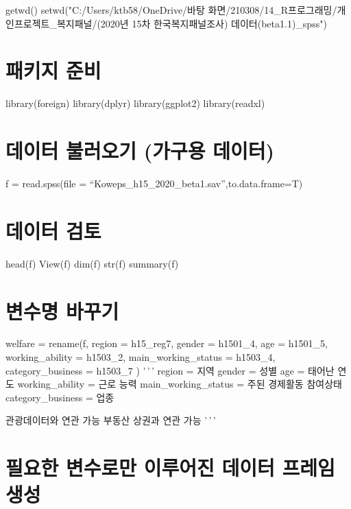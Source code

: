 \documentclass[
]{article}
\author{}
\date{\vspace{-2.5em}}
\begin{document}
getwd() setwd("C:/Users/ktb58/OneDrive/바탕
화면/210308/14\_R프로그래밍/개인프로젝트\_복지패널/(2020년 15차
한국복지패널조사) 데이터(beta1.1)\_spss")

\hypertarget{uxd328uxd0a4uxc9c0-uxc900uxbe44}{%
\section{패키지 준비}\label{uxd328uxd0a4uxc9c0-uxc900uxbe44}}

library(foreign) library(dplyr) library(ggplot2) library(readxl)

\hypertarget{uxb370uxc774uxd130-uxbd88uxb7ecuxc624uxae30-uxac00uxad6cuxc6a9-uxb370uxc774uxd130}{%
\section{데이터 불러오기 (가구용
데이터)}\label{uxb370uxc774uxd130-uxbd88uxb7ecuxc624uxae30-uxac00uxad6cuxc6a9-uxb370uxc774uxd130}}

f = read.spss(file = ``Koweps\_h15\_2020\_beta1.sav'',to.data.frame=T)

\hypertarget{uxb370uxc774uxd130-uxac80uxd1a0}{%
\section{데이터 검토}\label{uxb370uxc774uxd130-uxac80uxd1a0}}

head(f) View(f) dim(f) str(f) summary(f)

\hypertarget{uxbcc0uxc218uxba85-uxbc14uxafb8uxae30}{%
\section{변수명 바꾸기}\label{uxbcc0uxc218uxba85-uxbc14uxafb8uxae30}}

welfare = rename(f, region = h15\_reg7, gender = h1501\_4, age =
h1501\_5, working\_ability = h1503\_2, main\_working\_status = h1503\_4,
category\_business = h1503\_7 ) '\,'\,' region = 지역 gender = 성별 age
= 태어난 연도 working\_ability = 근로 능력 main\_working\_status = 주된
경제활동 참여상태 category\_business = 업종

관광데이터와 연관 가능 부동산 상권과 연관 가능 '\,'\,'

\hypertarget{uxd544uxc694uxd55c-uxbcc0uxc218uxb85cuxb9cc-uxc774uxb8e8uxc5b4uxc9c4-uxb370uxc774uxd130-uxd504uxb808uxc784-uxc0dduxc131}{%
\section{필요한 변수로만 이루어진 데이터 프레임
생성}\label{uxd544uxc694uxd55c-uxbcc0uxc218uxb85cuxb9cc-uxc774uxb8e8uxc5b4uxc9c4-uxb370uxc774uxd130-uxd504uxb808uxc784-uxc0dduxc131}}
\end{document}
